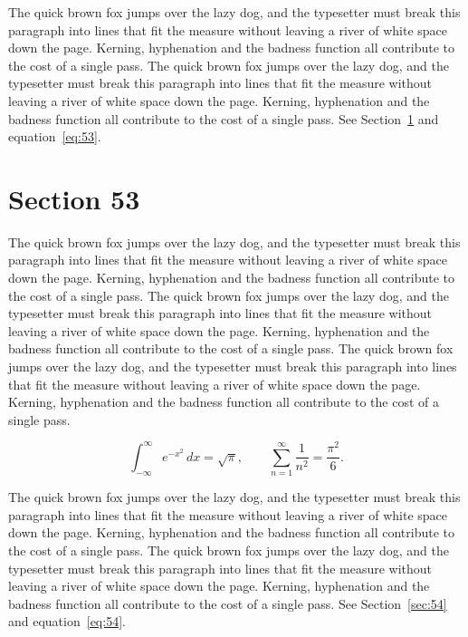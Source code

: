 \documentclass{article}
\begin{document}
The quick brown fox jumps over the lazy dog, and the typesetter must break this paragraph into lines that fit the measure without leaving a river of white space down the page. Kerning, hyphenation and the badness function all contribute to the cost of a single pass. The quick brown fox jumps over the lazy dog, and the typesetter must break this paragraph into lines that fit the measure without leaving a river of white space down the page. Kerning, hyphenation and the badness function all contribute to the cost of a single pass. 
See Section~\ref{sec:53} and equation~\eqref{eq:53}.
\section{Section 53}
\label{sec:53}
The quick brown fox jumps over the lazy dog, and the typesetter must break this paragraph into lines that fit the measure without leaving a river of white space down the page. Kerning, hyphenation and the badness function all contribute to the cost of a single pass. The quick brown fox jumps over the lazy dog, and the typesetter must break this paragraph into lines that fit the measure without leaving a river of white space down the page. Kerning, hyphenation and the badness function all contribute to the cost of a single pass. The quick brown fox jumps over the lazy dog, and the typesetter must break this paragraph into lines that fit the measure without leaving a river of white space down the page. Kerning, hyphenation and the badness function all contribute to the cost of a single pass. 

\begin{equation}\label{eq:53}
\int_{-\infty}^{\infty} e^{-x^{2}}\,dx = \sqrt{\pi}, \qquad
\sum_{n=1}^{\infty} \frac{1}{n^{2}} = \frac{\pi^{2}}{6}.
\end{equation}

The quick brown fox jumps over the lazy dog, and the typesetter must break this paragraph into lines that fit the measure without leaving a river of white space down the page. Kerning, hyphenation and the badness function all contribute to the cost of a single pass. The quick brown fox jumps over the lazy dog, and the typesetter must break this paragraph into lines that fit the measure without leaving a river of white space down the page. Kerning, hyphenation and the badness function all contribute to the cost of a single pass. 
See Section~\ref{sec:54} and equation~\eqref{eq:54}.
\end{document}
